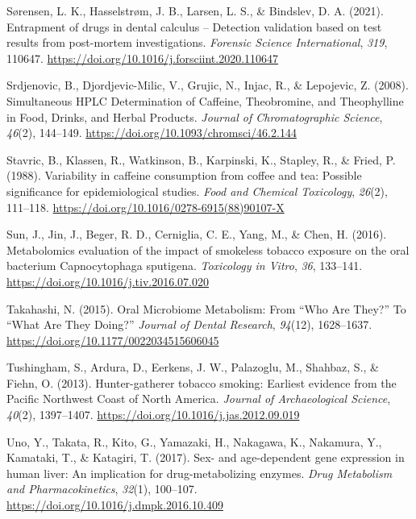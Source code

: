 \documentclass[
  11pt,
  leqno]{scrartcl}
\newlength{\cslhangindent}
\newenvironment{CSLReferences}[2] %
 {\begin{list}{}{%
  \setlength{\itemindent}{0pt}
  \setlength{\leftmargin}{0pt}
  \setlength{\parsep}{0pt}
  \ifodd #1
   \setlength{\leftmargin}{\cslhangindent}
   \setlength{\itemindent}{-1\cslhangindent}
  \fi
  \setlength{\itemsep}{#2\baselineskip}}}
 {\end{list}}
\begin{document}
\begin{CSLReferences}{1}{0}
Sørensen, L. K., Hasselstrøm, J. B., Larsen, L. S., \& Bindslev, D. A.
(2021). Entrapment of drugs in dental calculus -- {Detection} validation
based on test results from post-mortem investigations. \emph{Forensic
Science International}, \emph{319}, 110647.
\url{https://doi.org/10.1016/j.forsciint.2020.110647}

Srdjenovic, B., Djordjevic-Milic, V., Grujic, N., Injac, R., \&
Lepojevic, Z. (2008). Simultaneous {HPLC Determination} of {Caffeine},
{Theobromine}, and {Theophylline} in {Food}, {Drinks}, and {Herbal
Products}. \emph{Journal of Chromatographic Science}, \emph{46}(2),
144--149. \url{https://doi.org/10.1093/chromsci/46.2.144}

Stavric, B., Klassen, R., Watkinson, B., Karpinski, K., Stapley, R., \&
Fried, P. (1988). Variability in caffeine consumption from coffee and
tea: {Possible} significance for epidemiological studies. \emph{Food and
Chemical Toxicology}, \emph{26}(2), 111--118.
\url{https://doi.org/10.1016/0278-6915(88)90107-X}

Sun, J., Jin, J., Beger, R. D., Cerniglia, C. E., Yang, M., \& Chen, H.
(2016). Metabolomics evaluation of the impact of smokeless tobacco
exposure on the oral bacterium {Capnocytophaga} sputigena.
\emph{Toxicology in Vitro}, \emph{36}, 133--141.
\url{https://doi.org/10.1016/j.tiv.2016.07.020}

Takahashi, N. (2015). Oral {Microbiome Metabolism}: {From} {``{Who Are
They}?''} To {``{What Are They Doing}?''} \emph{Journal of Dental
Research}, \emph{94}(12), 1628--1637.
\url{https://doi.org/10.1177/0022034515606045}

Tushingham, S., Ardura, D., Eerkens, J. W., Palazoglu, M., Shahbaz, S.,
\& Fiehn, O. (2013). Hunter-gatherer tobacco smoking: Earliest evidence
from the {Pacific Northwest Coast} of {North America}. \emph{Journal of
Archaeological Science}, \emph{40}(2), 1397--1407.
\url{https://doi.org/10.1016/j.jas.2012.09.019}

Uno, Y., Takata, R., Kito, G., Yamazaki, H., Nakagawa, K., Nakamura, Y.,
Kamataki, T., \& Katagiri, T. (2017). Sex- and age-dependent gene
expression in human liver: {An} implication for drug-metabolizing
enzymes. \emph{Drug Metabolism and Pharmacokinetics}, \emph{32}(1),
100--107. \url{https://doi.org/10.1016/j.dmpk.2016.10.409}


\end{CSLReferences}
\end{document}
